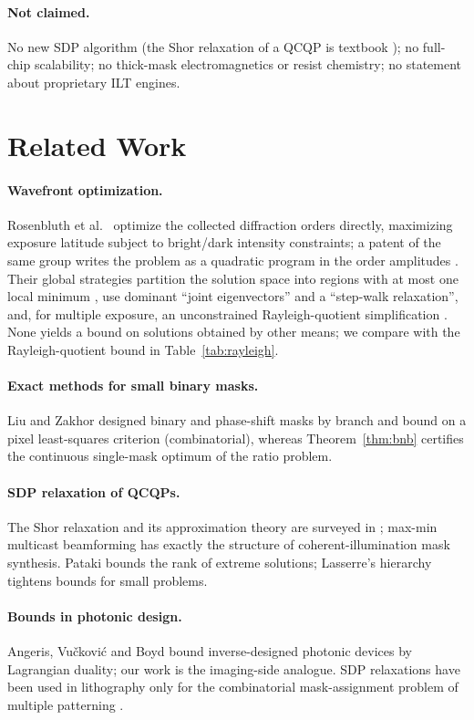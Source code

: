 \documentclass[11pt,a4paper]{article}
\begin{document}
\paragraph{Not claimed.} No new SDP algorithm (the Shor relaxation of a QCQP is textbook \cite{luo2010,boyd2004}); no full-chip scalability; no thick-mask electromagnetics or resist chemistry; no statement about proprietary ILT engines.

\section{Related Work}
\paragraph{Wavefront optimization.} Rosenbluth et al.\ \cite{rosenbluth2002,rosenbluth2007} optimize the collected diffraction orders directly, maximizing exposure latitude subject to bright/dark intensity constraints; a patent of the same group writes the problem as a quadratic program in the order amplitudes \cite{ibm_patents}. Their global strategies partition the solution space into regions with at most one local minimum \cite{rosenbluth2007}, use dominant ``joint eigenvectors'' and a ``step-walk relaxation'', and, for multiple exposure, an unconstrained Rayleigh-quotient simplification \cite{ibm_patents}. None yields a bound on solutions obtained by other means; we compare with the Rayleigh-quotient bound in Table~\ref{tab:rayleigh}.
\paragraph{Exact methods for small binary masks.} Liu and Zakhor \cite{liu1992} designed binary and phase-shift masks by branch and bound on a pixel least-squares criterion (combinatorial), whereas Theorem~\ref{thm:bnb} certifies the continuous single-mask optimum of the ratio problem.
\paragraph{SDP relaxation of QCQPs.} The Shor relaxation and its approximation theory are surveyed in \cite{luo2010}; max-min multicast beamforming \cite{sidiropoulos2006} has exactly the structure of coherent-illumination mask synthesis. Pataki \cite{pataki1998} bounds the rank of extreme solutions; Lasserre's hierarchy \cite{lasserre2001} tightens bounds for small problems.
\paragraph{Bounds in photonic design.} Angeris, Vu\v{c}kovi\'c and Boyd \cite{angeris2019,angeris2021} bound inverse-designed photonic devices by Lagrangian duality; our work is the imaging-side analogue. SDP relaxations have been used in lithography only for the combinatorial mask-assignment problem of multiple patterning \cite{kohira2016}.
\end{document}

